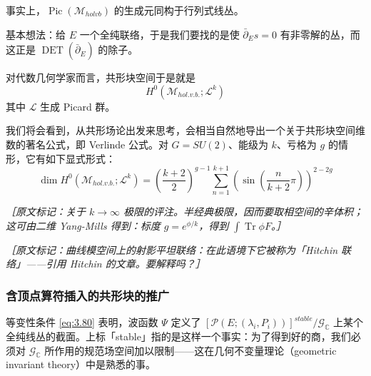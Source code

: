 事实上，$\operatorname{Pic}(\mathcal{M}_{holvb})$ 的生成元同构于行列式线丛。

基本想法：给 $E$ 一个全纯联络，于是我们要找的是使 $\bar\partial_Es=0$ 有非零解的丛，而这正是 $\operatorname{DET}(\bar\partial_E)$ 的除子。

对代数几何学家而言，共形块空间于是就是
\begin{equation}
  H^0(\mathcal{M}_{hol.v.b.};\mathcal{L}^k)
  \tag{3.89}
  \label{eq:3.89}
\end{equation}
其中 $\mathcal{L}$ 生成 Picard 群。

我们将会看到，从共形场论出发来思考，会相当自然地导出一个关于共形块空间维数的著名公式，即 Verlinde 公式。对 $G=SU(2)$、能级为 $k$、亏格为 $g$ 的情形，它有如下显式形式：
\begin{equation}
  \dim H^0(\mathcal{M}_{hol.v.b.};\mathcal{L}^k)
  =\left(\frac{k+2}{2}\right)^{g-1}\sum_{n=1}^{k+1}\left(\sin\left(\frac{n}{k+2}\pi\right)\right)^{2-2g}
  \tag{3.90}
  \label{eq:3.90}
\end{equation}


{\small\itshape ［原文标记：关于 $k\to\infty$ 极限的评注。半经典极限，因而要取相空间的辛体积；这可由二维 Yang-Mills 得到：标度 $g=e^{\phi/k}$，得到 $\int\operatorname{Tr}\phi F$。］}

{\small\itshape ［原文标记：曲线模空间上的射影平坦联络：在此语境下它被称为「Hitchin 联络」——引用 Hitchin 的文章。要解释吗？］}

\subsubsection{含顶点算符插入的共形块的推广} %

等变性条件 \eqref{eq:3.80} 表明，波函数 $\Psi$ 定义了 $[\mathcal{P}(E;(\lambda_i,P_i))]^{stable}/\mathcal{G}_{\mathbb{C}}$ 上某个全纯线丛的截面。上标「stable」指的是这样一个事实：为了得到好的商，我们必须对 $\mathcal{G}_{\mathbb{C}}$ 所作用的规范场空间加以限制——这在几何不变量理论（geometric invariant theory）中是熟悉的事。

